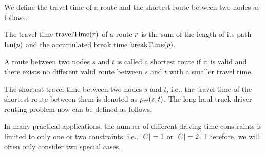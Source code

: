 We define the travel time of a route and the shortest route between two nodes as follows.

\begin{definition}
	The travel time $\operatorname{travelTime}(r)$ of a route $r$ is the sum of the length of its path $\operatorname{len}(p)$ and the accumulated break time $\operatorname{breakTime}(p)$.
\end{definition}

\begin{definition}
	A route between two nodes $s$ and $t$ is called a shortest route if it is valid and there exists no different valid route between $s$ and $t$ with a smaller travel time.
\end{definition}

The shortest travel time between two nodes $s$ and $t$, i.e., the travel time of the shortest route between them is denoted as $\mu_{tt}(s,t)$. The long-haul truck driver routing problem now can be defined as follows.

\begin{namedproblem}
\end{namedproblem}

In many practical applications, the number of different driving time constraints is limited to only one or two constraints, i.e., $|C| = 1$ or  $|C| = 2$. Therefore, we will often only consider two special cases.